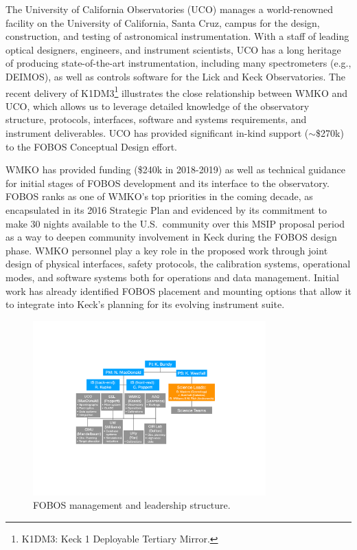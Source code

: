 \documentclass[oneside,11pt]{amsart}
\begin{document}
\medskip

The University of California Observatories (UCO) manages a
world-renowned facility on the University of California, Santa Cruz,
campus for the design, construction, and testing of astronomical
instrumentation. With a staff of leading optical designers,
engineers, and instrument scientists, UCO has a long heritage of
producing state-of-the-art instrumentation, including many
spectrometers (e.g., DEIMOS), as well as controls software for the
Lick and Keck Observatories. The recent delivery of
K1DM3\footnote{K1DM3: Keck 1 Deployable Tertiary Mirror.} illustrates
the close relationship between WMKO and UCO, which allows us to
leverage detailed knowledge of the observatory structure, protocols,
interfaces, software and systems requirements, and instrument
deliverables. UCO has provided significant in-kind support
($\sim$\$270k) to the FOBOS Conceptual Design effort.

 WMKO has provided funding
(\$240k in 2018-2019) as well as technical guidance for initial
stages of FOBOS development and its interface to the observatory.
FOBOS ranks as one of WMKO's top priorities in the coming decade, as
encapsulated in its 2016 Strategic Plan and evidenced by its
commitment to make 30 nights available to the U.S.\ community over
this MSIP proposal period as a way to deepen community involvement in
Keck during the FOBOS design phase. WMKO personnel play a key role in
the proposed work through joint design of physical interfaces, safety
protocols, the calibration systems, operational modes, and software
systems both for operations and data management. Initial work has
already identified FOBOS placement and mounting options that allow it
to integrate into Keck's planning for its evolving instrument suite.

\begin{figure}[h!]
\vskip -0.1in
\includegraphics[width=0.8\textwidth]{org_chart_v3.pdf}
\caption{\small FOBOS management and leadership structure.}
\label{fig:org}
\end{figure}
\end{document}
